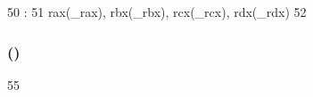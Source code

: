\begin{DoxyCode}
50                                                   :
51             rax(_rax), rbx(_rbx), rcx(_rcx), rdx(_rdx)
52         {}

\end{DoxyCode}
\hypertarget{structX86ISA_1_1CpuidResult_abdcc885897d6f2205cb24c21b197588c}{
\subsubsection[{CpuidResult}]{ ()}}
\label{structX86ISA_1_1CpuidResult_abdcc885897d6f2205cb24c21b197588c}



\begin{DoxyCode}
55         {}
\end{DoxyCode}


